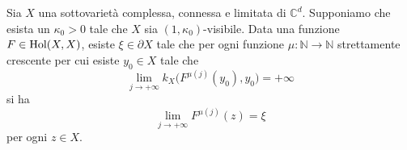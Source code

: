 \begin{prop} \label{inf_impl_ugu}
    Sia $X$ una sottovarietà complessa, connessa e limitata di $\mathbb{C}^d$. Supponiamo che esista un $\kappa_0>0$ tale che $X$ sia $(1,\kappa_0)$-visibile. Data una funzione $F\in\textnormal{Hol}(X,X)$, esiste $\xi\in\partial X$ tale che per ogni funzione $\mu:\mathbb{N}\longrightarrow\mathbb{N}$ strettamente crescente per cui esiste $y_0 \in X$ tale che
    \begin{equation}
        \lim_{j\longrightarrow+\infty} k_X\big(F^{\mu(j)}(y_0),y_0\big)=+\infty
    \end{equation}
    si ha
    \begin{equation}
        \lim_{j\longrightarrow+\infty} F^{\mu(j)}(z)=\xi
    \end{equation}
    per ogni $z \in X$.
\end{prop}

